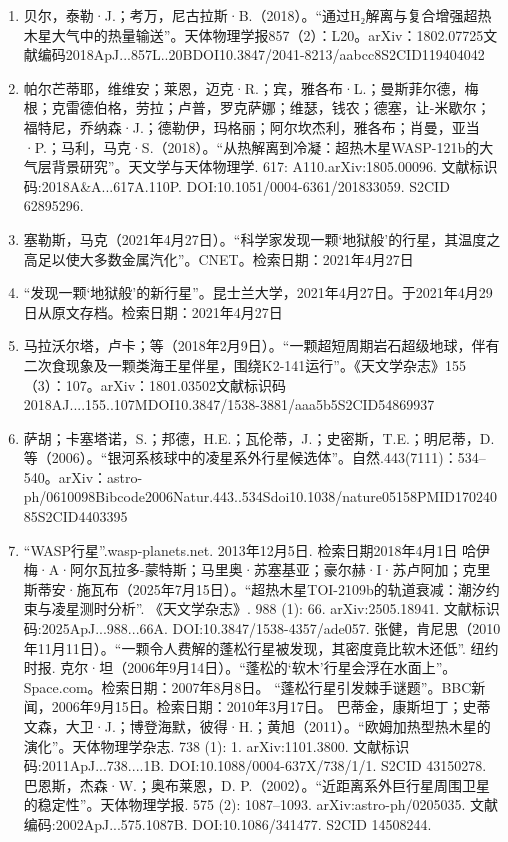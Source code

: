 \begin{enumerate}
\item 贝尔，泰勒·J.；考万，尼古拉斯·B.（2018）。“通过H₂解离与复合增强超热木星大气中的热量输送”。天体物理学报857（2）：L20。arXiv：1802.07725文献编码2018ApJ...857L..20BDOI10.3847/2041-8213/aabcc8S2CID119404042
\item 帕尔芒蒂耶，维维安；莱恩，迈克·R.；宾，雅各布·L.；曼斯菲尔德，梅根；克雷德伯格，劳拉；卢普，罗克萨娜；维瑟，钱农；德塞，让-米歇尔；福特尼，乔纳森·J.；德勒伊，玛格丽；阿尔坎杰利，雅各布；肖曼，亚当·P.；马利，马克·S.（2018）。“从热解离到冷凝：超热木星WASP-121b的大气层背景研究”。天文学与天体物理学. 617: A110.arXiv:1805.00096. 文献标识码:2018A&A...617A.110P. DOI:10.1051/0004-6361/201833059. S2CID 62895296.
\item 塞勒斯，马克（2021年4月27日）。“科学家发现一颗‘地狱般’的行星，其温度之高足以使大多数金属汽化”。CNET。检索日期：2021年4月27日
\item “发现一颗‘地狱般’的新行星”。昆士兰大学，2021年4月27日。于2021年4月29日从原文存档。检索日期：2021年4月27日
\item 马拉沃尔塔，卢卡；等（2018年2月9日）。“一颗超短周期岩石超级地球，伴有二次食现象及一颗类海王星伴星，围绕K2-141运行”。《天文学杂志》155（3）：107。arXiv：1801.03502文献标识码2018AJ....155..107MDOI10.3847/1538-3881/aaa5b5S2CID54869937
\item 萨胡；卡塞塔诺，S.；邦德，H.E.；瓦伦蒂，J.；史密斯，T.E.；明尼蒂，D.等（2006）。“银河系核球中的凌星系外行星候选体”。自然.443(7111)：534–540。arXiv：astro-ph/0610098Bibcode2006Natur.443..534Sdoi10.1038/nature05158PMID17024085S2CID4403395
\item “WASP行星”.wasp-planets.net. 2013年12月5日. 检索日期2018年4月1日
 哈伊梅·A·阿尔瓦拉多-蒙特斯；马里奥·苏塞基亚；豪尔赫·I·苏卢阿加；克里斯蒂安·施瓦布（2025年7月15日）。“超热木星TOI-2109b的轨道衰减：潮汐约束与凌星测时分析”. 《天文学杂志》. 988 (1): 66. arXiv:2505.18941. 文献标识码:2025ApJ...988...66A. DOI:10.3847/1538-4357/ade057.
 张健，肯尼思（2010年11月11日）。“一颗令人费解的蓬松行星被发现，其密度竟比软木还低”. 纽约时报.
 克尔·坦（2006年9月14日）。“蓬松的‘软木’行星会浮在水面上”。Space.com。检索日期：2007年8月8日。
 “蓬松行星引发棘手谜题”。BBC新闻，2006年9月15日。检索日期：2010年3月17日。
 巴蒂金，康斯坦丁；史蒂文森，大卫·J.；博登海默，彼得·H.；黄旭（2011）。“欧姆加热型热木星的演化”。天体物理学杂志. 738 (1): 1. arXiv:1101.3800. 文献标识码:2011ApJ...738....1B. DOI:10.1088/0004-637X/738/1/1. S2CID 43150278.
 巴恩斯，杰森·W.；奥布莱恩，D. P.（2002）。“近距离系外巨行星周围卫星的稳定性”。天体物理学报. 575 (2): 1087–1093. arXiv:astro-ph/0205035. 文献编码:2002ApJ...575.1087B. DOI:10.1086/341477. S2CID 14508244.

\end{enumerate}
